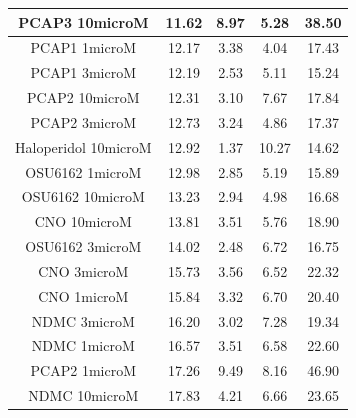 \documentclass[a4paper,12pt]{article}
\begin{document}
\begin{table}[h!]
\begin{tabular}{|c|c|c|c|c|}
PCAP3 10microM      & 11.62 & 8.97 & 5.28  & 38.50  \\ \hline
PCAP1 1microM         & 12.17 & 3.38 & 4.04  & 17.43 \\ \hline
PCAP1 3microM         & 12.19 & 2.53 & 5.11  & 15.24 \\ \hline
PCAP2 10microM        & 12.31 & 3.10  & 7.67  & 17.84 \\ \hline
PCAP2 3microM         & 12.73 & 3.24 & 4.86  & 17.37 \\ \hline
Haloperidol 10microM  & 12.92 & 1.37 & 10.27 & 14.62 \\ \hline
OSU6162 1microM       & 12.98 & 2.85 & 5.19  & 15.89 \\ \hline
OSU6162 10microM      & 13.23 & 2.94 & 4.98  & 16.68 \\ \hline
CNO 10microM          & 13.81 & 3.51 & 5.76  & 18.90  \\ \hline
OSU6162 3microM       & 14.02 & 2.48 & 6.72  & 16.75 \\ \hline
CNO 3microM           & 15.73 & 3.56 & 6.52  & 22.32 \\ \hline
CNO 1microM           & 15.84 & 3.32 & 6.70   & 20.40  \\ \hline
NDMC 3microM          & 16.20  & 3.02 & 7.28  & 19.34 \\ \hline
NDMC 1microM          & 16.57 & 3.51 & 6.58  & 22.60  \\ \hline
PCAP2 1microM         & 17.26 & 9.49 & 8.16  & 46.90  \\ \hline
NDMC 10microM         & 17.83 & 4.21 & 6.66  & 23.65 \\ \hline
\end{tabular}
\end{table}
\newpage
\end{document}
